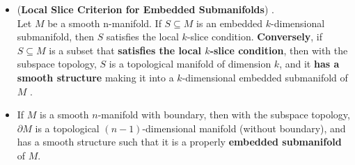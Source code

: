 \documentclass[11pt]{article}
\begin{document}
\begin{itemize}
\item \begin{theorem} (\textbf{Local Slice Criterion for Embedded Submanifolds})  \citep{lee2003introduction}.\\
Let $M$ be a smooth n-manifold. If $S \subseteq M$ is an embedded $k$-dimensional submanifold, then $S$ satisfies the local $k$-slice condition. \textbf{Conversely}, if $S \subseteq M$ is a subset that \textbf{satisfies the local $k$-slice condition}, then with the subspace topology, $S$ is a topological manifold of dimension $k$, and it \textbf{has a smooth structure} making it into a $k$-dimensional embedded submanifold of $M$ .
\end{theorem}

\item \begin{theorem}
If $M$ is a smooth $n$-manifold with boundary, then with the subspace topology, $\partial M$ is a topological $(n-1)$-dimensional manifold (without boundary), and has a smooth structure such that it is a properly \textbf{embedded submanifold} of $M$.
\end{theorem}
\end{itemize}
\end{document}
